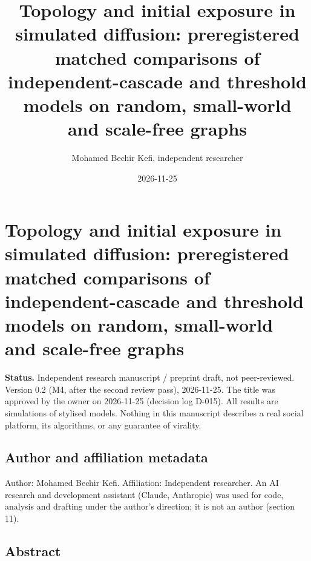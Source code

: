 \documentclass[
]{article}
\title{Topology and initial exposure in simulated diffusion:
preregistered matched comparisons of independent-cascade and threshold
models on random, small-world and scale-free graphs}
\author{Mohamed Bechir Kefi, independent researcher}
\date{2026-11-25}
\begin{document}
\maketitle

\section{Topology and initial exposure in simulated diffusion:
preregistered matched comparisons of independent-cascade and threshold
models on random, small-world and scale-free
graphs}\label{topology-and-initial-exposure-in-simulated-diffusion-preregistered-matched-comparisons-of-independent-cascade-and-threshold-models-on-random-small-world-and-scale-free-graphs}

\textbf{Status.} Independent research manuscript / preprint draft, not
peer-reviewed. Version 0.2 (M4, after the second review pass),
2026-11-25. The title was approved by the owner on 2026-11-25 (decision
log D-015). All results are simulations of stylised models. Nothing in
this manuscript describes a real social platform, its algorithms, or any
guarantee of virality.

\subsection{Author and affiliation
metadata}\label{author-and-affiliation-metadata}

Author: Mohamed Bechir Kefi. Affiliation: Independent researcher. An AI
research and development assistant (Claude, Anthropic) was used for
code, analysis and drafting under the author's direction; it is not an
author (section 11).

\subsection{Abstract}\label{abstract}
\end{document}
